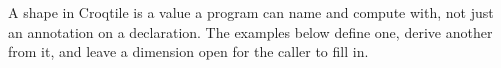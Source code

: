 A shape in Croqtile is a value a program can name and compute with, not just an annotation on a declaration. The examples below define one, derive another from it, and leave a dimension open for the caller to fill in.
